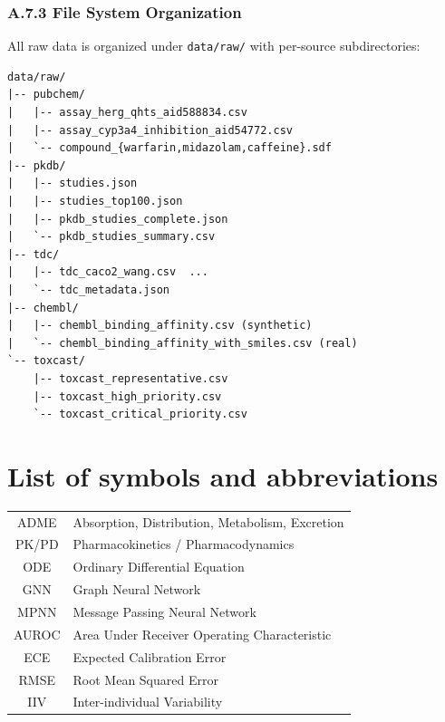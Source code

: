 \documentclass[a4paper,11pt,twoside]{report}
\begin{document}
\subsection*{A.7.3 File System Organization}

All raw data is organized under \texttt{data/raw/} with per-source subdirectories:

\begin{verbatim}
data/raw/
|-- pubchem/
|   |-- assay_herg_qhts_aid588834.csv
|   |-- assay_cyp3a4_inhibition_aid54772.csv
|   `-- compound_{warfarin,midazolam,caffeine}.sdf
|-- pkdb/
|   |-- studies.json
|   |-- studies_top100.json
|   |-- pkdb_studies_complete.json
|   `-- pkdb_studies_summary.csv
|-- tdc/
|   |-- tdc_caco2_wang.csv  ...
|   `-- tdc_metadata.json
|-- chembl/
|   |-- chembl_binding_affinity.csv (synthetic)
|   `-- chembl_binding_affinity_with_smiles.csv (real)
`-- toxcast/
    |-- toxcast_representative.csv
    |-- toxcast_high_priority.csv
    `-- toxcast_critical_priority.csv
\end{verbatim}








\chapter*{List of symbols and abbreviations}

\begin{tabular}{cl}
ADME & Absorption, Distribution, Metabolism, Excretion \\
PK/PD & Pharmacokinetics / Pharmacodynamics \\
ODE & Ordinary Differential Equation \\
GNN & Graph Neural Network \\
MPNN & Message Passing Neural Network \\
AUROC & Area Under Receiver Operating Characteristic \\
ECE & Expected Calibration Error \\
RMSE & Root Mean Squared Error \\
IIV & Inter-individual Variability \\
\end{tabular}
\thispagestyle{empty}
\end{document}
